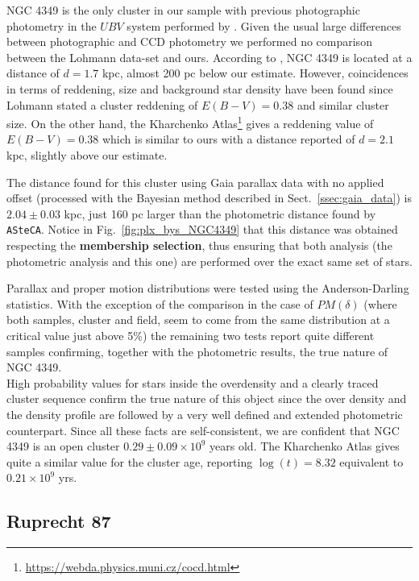 \documentclass[draft]{aa}
\begin{document}
NGC 4349 is the only cluster in our sample with previous photographic photometry
in the $UBV$ system performed by \cite{Lohmann_1961}. Given the usual large
differences between photographic and CCD photometry we performed no comparison
between the Lohmann data-set and ours. According to \cite{Lohmann_1961}, NGC
4349 is located at a distance of $d=1.7$ kpc, almost 200 pc below our estimate.
However, coincidences in terms of reddening, size and background star density
have been found since Lohmann stated a cluster reddening of $E(B-V)=0.38$
and similar cluster size. On the other hand, the Kharchenko
Atlas\footnote{\url{https://webda.physics.muni.cz/cocd.html}}
\citep{Kharchenko_2005} gives a reddening value of $E(B-V)=0.38$ which is
similar to ours with a distance reported of $d=2.1$ kpc, slightly
above our estimate.

The distance found for this cluster using Gaia parallax data with no applied
offset (processed with the Bayesian method described in
Sect.~\ref{ssec:gaia_data}) is $2.04\pm0.03$ kpc, just 160 pc
larger than the photometric distance found by \texttt{ASteCA}.
Notice in Fig.~\ref{fig:plx_bys_NGC4349} that this distance was obtained
respecting the \textbf{membership selection}, thus ensuring that both analysis 
(the photometric analysis and this one) are performed over the exact same set
of stars.

Parallax and proper motion distributions were tested using the Anderson-Darling
statistics. With the exception of the comparison in the case of $PM(\delta)$
(where both samples, cluster and field, seem to come from the same distribution
at a critical value just above 5\%) the remaining two tests report quite
different samples confirming, together with the photometric results, the true
nature of NGC 4349.\\

High probability values for stars inside the overdensity and a clearly traced
cluster sequence confirm the true nature of this object since the over density
and the density profile are followed by a very well defined and extended
photometric counterpart.
Since all these facts are self-consistent, we are confident that NGC 4349 is
an open cluster $0.29\pm0.09\times10^9$ years old.
The Kharchenko Atlas gives quite a similar value for the cluster age, reporting
$\log(t)=8.32$ equivalent to $0.21\times10^9$ yrs.




\subsection{Ruprecht 87}
\end{document}
